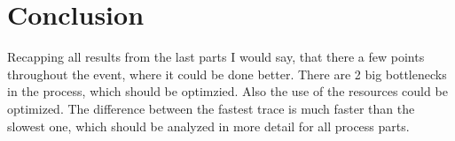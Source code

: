 \section{Conclusion}
Recapping all results from the last parts I would say, that there a few points throughout the event, where it could be done better. There are 2 big bottlenecks in the process, which should be optimzied. Also the use of the resources could be optimized. The difference between the fastest trace is much faster than the slowest one, which should be analyzed in more detail for all process parts.